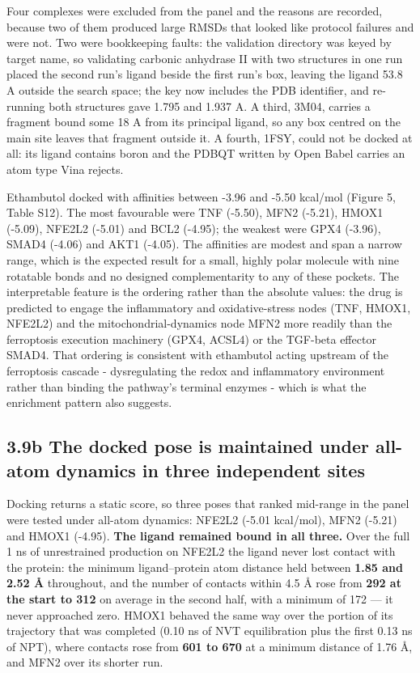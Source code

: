 \documentclass[utf8]{FrontiersinVancouver}
\begin{document}
Four complexes were excluded from the panel and the reasons are recorded, because two of them produced large RMSDs that looked like protocol failures and were not. Two were bookkeeping faults: the validation directory was keyed by target name, so validating carbonic anhydrase II with two structures in one run placed the second run's ligand beside the first run's box, leaving the ligand 53.8 A outside the search space; the key now includes the PDB identifier, and re-running both structures gave 1.795 and 1.937 A. A third, 3M04, carries a fragment bound some 18 A from its principal ligand, so any box centred on the main site leaves that fragment outside it. A fourth, 1FSY, could not be docked at all: its ligand contains boron and the PDBQT written by Open Babel carries an atom type Vina rejects.

Ethambutol docked with affinities between -3.96 and -5.50 kcal/mol (Figure 5, Table S12). The most favourable were TNF (-5.50), MFN2 (-5.21), HMOX1 (-5.09), NFE2L2 (-5.01) and BCL2 (-4.95); the weakest were GPX4 (-3.96), SMAD4 (-4.06) and AKT1 (-4.05). The affinities are modest and span a narrow range, which is the expected result for a small, highly polar molecule with nine rotatable bonds and no designed complementarity to any of these pockets. The interpretable feature is the ordering rather than the absolute values: the drug is predicted to engage the inflammatory and oxidative-stress nodes (TNF, HMOX1, NFE2L2) and the mitochondrial-dynamics node MFN2 more readily than the ferroptosis execution machinery (GPX4, ACSL4) or the TGF-beta effector SMAD4. That ordering is consistent with ethambutol acting upstream of the ferroptosis cascade - dysregulating the redox and inflammatory environment rather than binding the pathway's terminal enzymes - which is what the enrichment pattern also suggests.

\subsection{3.9b The docked pose is maintained under all-atom dynamics in three independent sites}

Docking returns a static score, so three poses that ranked mid-range in the panel were tested under all-atom dynamics: NFE2L2 (-5.01 kcal/mol), MFN2 (-5.21) and HMOX1 (-4.95). \textbf{The ligand remained bound in all three.} Over the full 1 ns of unrestrained production on NFE2L2 the ligand never lost contact with the protein: the minimum ligand--protein atom distance held between \textbf{1.85 and 2.52 \AA{}} throughout, and the number of contacts within 4.5 \AA{} rose from \textbf{292 at the start to 312} on average in the second half, with a minimum of 172 --- it never approached zero. HMOX1 behaved the same way over the portion of its trajectory that was completed (0.10 ns of NVT equilibration plus the first 0.13 ns of NPT), where contacts rose from \textbf{601 to 670} at a minimum distance of 1.76 \AA{}, and MFN2 over its shorter run.
\end{document}
